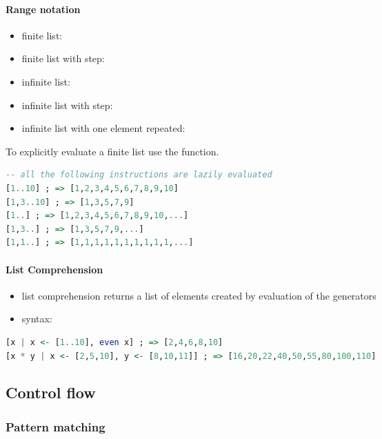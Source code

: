 \documentclass[a4paper,landscape,10pt]{article}
\begin{document}
\begin{multicols*}{2}
  \paragraph{Range notation}

  \begin{itemize}
    \item finite list: 
    \item finite list with step: 
    \item infinite list: \ihaskell{[<start>..]}
    \item infinite list with step: 
    \item infinite list with one element repeated: 
  \end{itemize}

  To explicitly evaluate a finite list use the  function.

  \begin{lstlisting}[language=Haskell]
-- all the following instructions are lazily evaluated
[1..10] ; => [1,2,3,4,5,6,7,8,9,10]
[1,3..10] ; => [1,3,5,7,9]
[1..] ; => [1,2,3,4,5,6,7,8,9,10,...]
[1,3..] ; => [1,3,5,7,9,...]
[1,1..] ; => [1,1,1,1,1,1,1,1,1,1,...]
\end{lstlisting}

  \paragraph{List Comprehension}

  \begin{itemize}
    \item list comprehension returns a list of elements created by evaluation of the generators
    \item syntax: 
  \end{itemize}

  \begin{lstlisting}[language=Haskell]
[x | x <- [1..10], even x] ; => [2,4,6,8,10]
[x * y | x <- [2,5,10], y <- [8,10,11]] ; => [16,20,22,40,50,55,80,100,110]
\end{lstlisting}

  \subsection{Control flow}

  \subsubsection{Pattern matching}


\end{multicols*}
\end{document}
